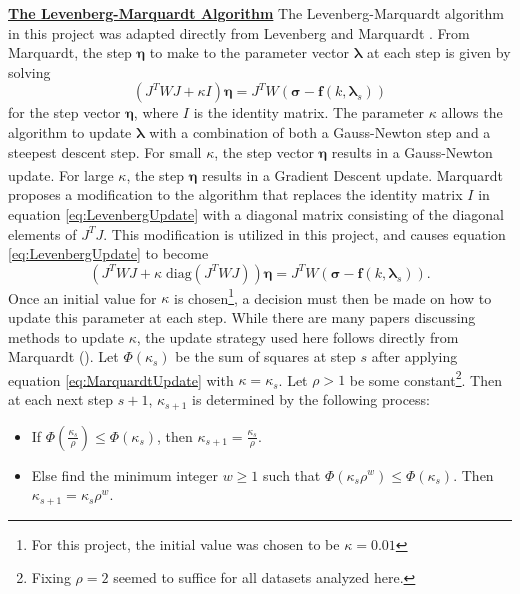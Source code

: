 \documentclass[12pt, a4paper, notitlepage]{article}
\numberwithin{equation}{subsection}
\numberwithin{figure}{subsection}
\numberwithin{table}{subsection}
\newcommand{\newpar}{\newline \newline}
\newcommand{\lambdaVect}{\pmb{\lambda}}
\begin{document}
\textbf{\underline{The Levenberg-Marquardt Algorithm}}
\newline
The Levenberg-Marquardt algorithm in this project was adapted directly from Levenberg \cite{Levenberg} and Marquardt \cite{Marquardt}.  From Marquardt, the step $\pmb{\eta}$ to make to the parameter vector $\lambdaVect$ at each step is given by solving
\begin{equation}
    (J^T W J + \kappa I)\pmb{\eta} = J^T W (\pmb{\sigma} - \pmb{f}(k,\lambdaVect_{s}))
    \label{eq:LevenbergUpdate}
\end{equation}
for the step vector $\pmb{\eta}$, where $I$ is the identity matrix.  The parameter $\kappa$ allows the algorithm to update $\lambdaVect$ with a combination of both a Gauss-Newton step and a steepest descent step.  For small $\kappa$, the step vector $\pmb{\eta}$ results in a Gauss-Newton update.  For large $\kappa$, the step $\pmb{\eta}$ results in a Gradient Descent update\textsuperscript{\cite{Gavin}}.
\newpar
Marquardt proposes a modification to the algorithm that replaces the identity matrix $I$ in equation \ref{eq:LevenbergUpdate} with a diagonal matrix consisting of the diagonal elements of $J^T J$.  This modification is utilized in this project, and causes equation \ref{eq:LevenbergUpdate} to become
\begin{equation}
    (J^T W J + \kappa \; \text{diag}(J^T W J))\pmb{\eta} = J^T W (\pmb{\sigma} - \pmb{f}(k,\lambdaVect_{s})).
    \label{eq:MarquardtUpdate}
\end{equation}
Once an initial value for $\kappa$ is chosen\footnote{For this project, the initial value was chosen to be $\kappa = 0.01$}, a decision must then be made on how to update this parameter at each step.  While there are many papers discussing methods to update $\kappa$, the update strategy used here follows directly from Marquardt (\cite{Marquardt}).
\newpar
Let $\Phi(\kappa_s)$ be the sum of squares at step $s$ after applying equation \ref{eq:MarquardtUpdate} with $\kappa = \kappa_s$.  Let $\rho > 1$ be some constant\footnote{Fixing $\rho = 2$ seemed to suffice for all datasets analyzed here.}.  Then at each next step $s + 1$, $\kappa_{s + 1}$ is determined by the following process:
\begin{itemize}
    \item If $\Phi( \frac{\kappa_{s}}{\rho}) \leq \Phi(\kappa_{s})$, then $\kappa_{s+1} = \frac{\kappa_{s}}{\rho}$.
    \item Else find the minimum integer $w \geq 1$ such that $\Phi(\kappa_s \rho^w) \leq \Phi(\kappa_{s})$.  Then $\kappa_{s+1} = \kappa_s \rho^w$.
\end{itemize}
\end{document}
